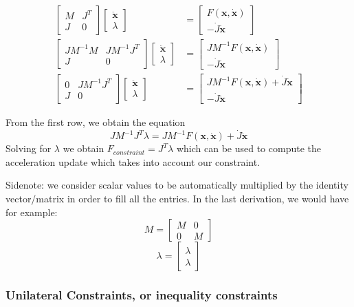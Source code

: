 \documentclass{article}
\begin{document}
\begin{align*}
\begin{bmatrix}
        M & J^T \\ J & 0
\end{bmatrix} 
\begin{bmatrix}
        \ddot{\mathbf{x}} \\ \lambda
\end{bmatrix} &= 
\begin{bmatrix}
    F(\mathbf{x} ,\dot{\mathbf{x}}) \\ -\dot{J} \dot{\mathbf{x}} 
\end{bmatrix} \\
\begin{bmatrix}
    J M^{-1} M & J M^{-1} J^T \\ J & 0
\end{bmatrix} 
\begin{bmatrix}
        \ddot{\mathbf{x}} \\ \lambda
\end{bmatrix} &= 
\begin{bmatrix}
    J M^{-1} F(\mathbf{x} ,\dot{\mathbf{x}}) \\ -\dot{J} \dot{\mathbf{x}} 
\end{bmatrix} \\
\begin{bmatrix}
    0 & J M^{-1} J^T \\ J & 0
\end{bmatrix} 
\begin{bmatrix}
        \ddot{\mathbf{x}} \\ \lambda
\end{bmatrix} &= 
\begin{bmatrix}
    J M^{-1} F(\mathbf{x} ,\dot{\mathbf{x}}) +\dot{J} \dot{\mathbf{x}} \\ -\dot{J} \dot{\mathbf{x}} 
\end{bmatrix}
\end{align*}

From the first row, we obtain the equation
\[
J M^{-1} J^T \lambda = J M^{-1} F(\mathbf{x}, \dot{\mathbf{x}}) + \dot{J} \dot{\mathbf{x}}
\]
Solving for $\lambda$ we obtain $F_{constraint} = J^T \lambda$ which can be used to compute the acceleration update which takes into account our constraint.

Sidenote: we consider scalar values to be automatically multiplied by the identity vector/matrix in order to fill all the entries. In the last derivation, we would have for example:
\[ M =
\begin{bmatrix}
        M & 0  \\ 0 & M
\end{bmatrix}
\]
\[ \lambda =
\begin{bmatrix}
        \lambda  \\ \lambda
\end{bmatrix}
\]

\subsubsection{Unilateral Constraints, or inequality constraints}
\end{document}
